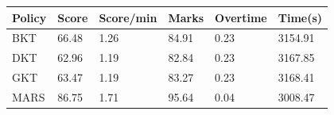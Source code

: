 \begin{tabular}{llllll}
\toprule
Policy & Score & Score/min & Marks & Overtime & Time(s) \\
\midrule
BKT & 66.48 & 1.26 & 84.91 & 0.23 & 3154.91 \\
DKT & 62.96 & 1.19 & 82.84 & 0.23 & 3167.85 \\
GKT & 63.47 & 1.19 & 83.27 & 0.23 & 3168.41 \\
MARS & 86.75 & 1.71 & 95.64 & 0.04 & 3008.47 \\
\bottomrule
\end{tabular}
